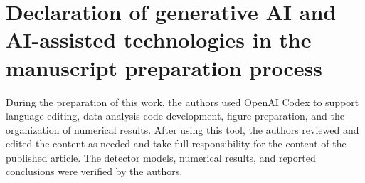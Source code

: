 \documentclass[preprint,11pt]{elsarticle}
\begin{document}
\section*{Declaration of generative AI and AI-assisted technologies in the
manuscript preparation process}

During the preparation of this work, the authors used OpenAI Codex to support
language editing, data-analysis code development, figure preparation, and the
organization of numerical results. After using this tool, the authors reviewed
and edited the content as needed and take full responsibility for the content
of the published article. The detector models, numerical results, and reported
conclusions were verified by the authors.

\begingroup
\footnotesize


\endgroup
\end{document}
